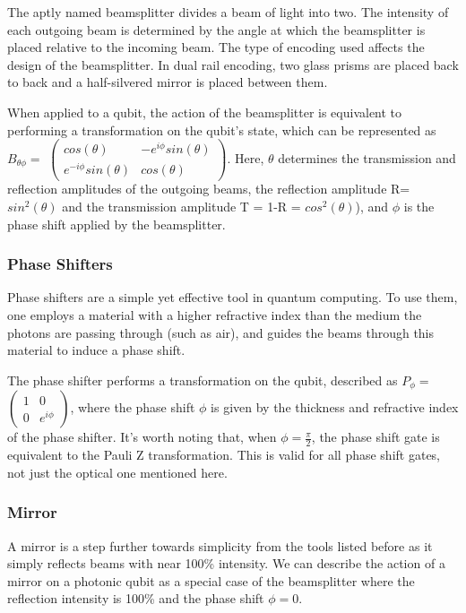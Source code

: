 The aptly named beamsplitter divides a beam of light into two. The intensity of each outgoing beam is determined by the angle at which the beamsplitter is placed relative to the incoming beam. The type of encoding used affects the design of the beamsplitter. In dual rail encoding, two glass prisms are placed back to back and a half-silvered mirror is placed between them. %

When applied to a qubit, the action of the beamsplitter is equivalent to performing a transformation on the qubit's state, which can be represented as $B_{\theta\phi} = $ $\begin{pmatrix}
cos(\theta) & -e^{i\phi}sin(\theta) \\
e^{-i\phi}sin(\theta) & cos(\theta) 
\end{pmatrix}$. Here, $\theta$ determines the transmission and reflection amplitudes of the outgoing beams, the reflection amplitude R= $sin^2(\theta)$ and the transmission amplitude T = 1-R = $cos^2(\theta)$), and $\phi$ is the phase shift applied by the beamsplitter.

\subsubsection{Phase Shifters}
Phase shifters are a simple yet effective tool in quantum computing. To use them, one employs a material with a higher refractive index than the medium the photons are passing through (such as air), and guides the beams through this material to induce a phase shift. 

The phase shifter performs a transformation on the qubit, described as $P_\phi = $ $\begin{pmatrix}
1 & 0 \\
0 & e^{i\phi}
\end{pmatrix}$, where the phase shift $\phi$ is given by the thickness and refractive index of the phase shifter. It's worth noting that, when $\phi = \frac{\pi}{2}$, the phase shift gate is equivalent to the Pauli Z transformation. This is valid for all phase shift gates, not just the optical one mentioned here.

\subsubsection{Mirror}
A mirror is a step further towards simplicity from the tools listed before as it simply reflects beams with near 100\% intensity. We can describe the action of a mirror on a photonic qubit as a special case of the beamsplitter where the reflection intensity is 100\% and the phase shift $\phi = 0$.

